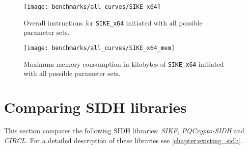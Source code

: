 \begin{figure}[H]
  \centering
  \texttt{[image: benchmarks/all\_curves/SIKE\_x64]}
  \caption[Overall instructions for all parameter sets via \texttt{SIKE\_x64}]
  {Overall instructions for \texttt{SIKE\_x64} initiated with all possible parameter sets.}
  \label{fig:results_all_curves}
\end{figure}

\begin{figure}[H]
  \centering
  \texttt{[image: benchmarks/all\_curves/SIKE\_x64\_mem]}
  \caption[Maximum memory consumption for all parameter sets via \texttt{SIKE\_x64}]
  {Maximum memory consumption in kilobytes of \texttt{SIKE\_x64} initiated with all possible parameter sets.}
  \label{fig:results_all_curves_mem}
\end{figure}

\section{Comparing \gls{SIDH} libraries}\label{sec:analysis_sidh_libs}

This section compares the following \gls{SIDH} libraries: \textit{SIKE}, \textit{\gls{PQCrypto-SIDH}} and \textit{\gls{CIRCL}}. For a detailed description of these libraries see \autoref{chapter:existing_sidh}.

